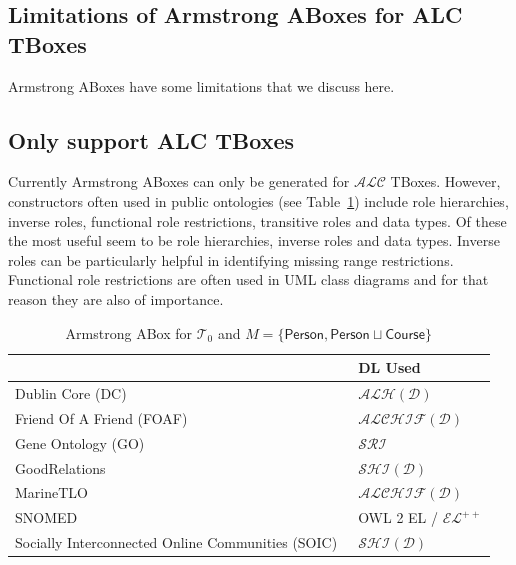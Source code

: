 \documentclass{amsart}
\begin{document}
  \subsection{Limitations of Armstrong ABoxes for ALC TBoxes} \label{subsec_ArmstrongABoxLimitations}
  Armstrong ABoxes have some limitations that we discuss here.
  \subsection{Only support ALC TBoxes}
  Currently Armstrong ABoxes can only be generated for $\mathcal{ALC}$ TBoxes. However, constructors often used in public ontologies (see Table~\ref{tab_PublicOntologies}) include role hierarchies, inverse roles, functional role restrictions, transitive roles and data types. Of these the most useful seem to be role hierarchies, inverse roles and data types. Inverse roles can be particularly helpful in identifying missing range restrictions. Functional role restrictions are often used in UML class diagrams and for that reason they are also of importance.
  
  
   \begin{table}
   \footnotesize
     \begin{center} 
       \caption{Armstrong ABox for $\mathcal{T}_0$ and $M=\{\mathsf{Person}, \mathsf{Person} \sqcup \mathsf{Course}\}$}
       \label{tab_PublicOntologies}
       \smallskip
       \begin{tabular}
       {|>{\footnotesize}p{8cm}|>{\footnotesize}p{3cm}|}
       \hline
       \multicolumn{1}{|>{\footnotesize}c|}{\textbf{Ontology}}&{\textbf{DL Used}}\\
       \hline       
        Dublin Core (DC)~\cite{DublinCore} & $\mathcal{ALH}(\mathcal{D})$\\
        Friend Of A Friend (FOAF)~\cite{FOAF} & $\mathcal{ALCHIF}(\mathcal{D})$\\
        Gene Ontology (GO)~\cite{GeneOntology} & $\mathcal{SRI}$\\
        GoodRelations~\cite{GoodRelations_v1} & $\mathcal{SHI}(\mathcal{D})$\\
        MarineTLO~\cite{MarineTLOv5} & $\mathcal{ALCHIF}(\mathcal{D})$ \\
        SNOMED & OWL 2 EL / $\mathcal{EL}^{++}$ \\
        Socially Interconnected Online Communities (SOIC)~\cite{SIOC} &  $\mathcal{SHI}(\mathcal{D})$ \\
       \hline      
       \end{tabular}
     \end{center}
     \normalsize
   \end{table} 
   
\end{document}
